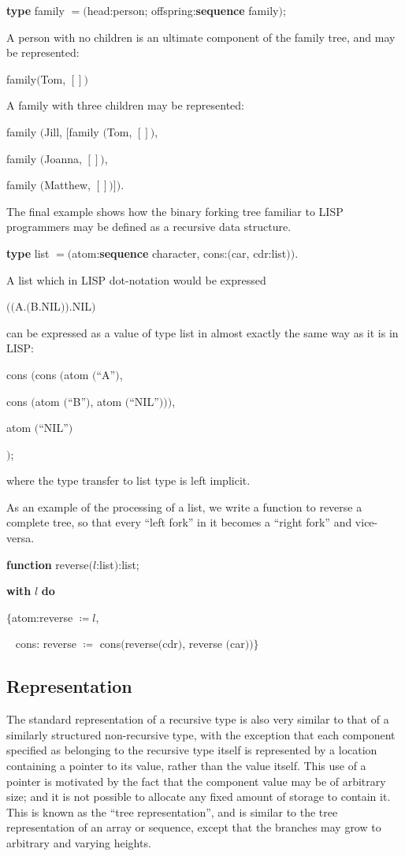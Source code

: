 \quad \textbf{type} family $= ($head:person; offspring:\textbf{sequence} family$)$;

A person with no children is an ultimate component of the family tree, and may be represented:

\quad family$($Tom, $[])$

\noindent
A family with three children may be represented:

\noindent
family $($Jill, $[$family $($Tom, $[])$,

\tabto{3.2em} family $($Joanna, $[])$,

\tabto{3.2em} family $($Matthew, $[])])$.

The final example shows how the binary forking tree familiar to LISP programmers may be defined as a recursive data structure.

\quad \textbf{type} list $= ($atom:\textbf{sequence} character, cons:$($car, cdr:list$))$.

\noindent
A list which in LISP dot-notation would be expressed

\quad $(($A.$($B.NIL$))$.NIL$)$

\noindent
can be expressed as a value of type list in almost exactly the same way as it is in LISP:

\quad cons $($cons $($atom $($``A''$)$,

\tabto{5em} cons $($atom $($``B''$)$, atom $($``NIL''$)))$,

\tabto{5em} atom $($``NIL''$)$

\tabto{4.8em} $)$;

\noindent
where the type transfer to list type is left implicit.

As an example of the processing of a list, we write a function to reverse a complete tree, so that every ``left fork'' in it becomes a ``right fork'' and vice-versa.

\quad \textbf{function} reverse$(l$:list$)$:list;

\quad \quad \textbf{with} $l$ \textbf{do}

\quad \quad \quad $\{$atom:reverse $\coloneq l$,

\quad \quad \quad ~ cons: reverse $\coloneq$ cons$($reverse$($cdr$)$, reverse $($car$))\}$

\subsection{Representation}

The standard representation of a recursive type is also very similar to that of a similarly structured non-recursive type, with the exception that each component specified as belonging to the recursive type itself is represented by a location containing a pointer to its value, rather than the value itself. This use of a pointer is motivated by the fact that the component value may be of arbitrary size; and it is not possible to allocate any fixed amount of storage to contain it. This is known as the ``tree representation'', and is similar to the tree representation of an array or sequence, except that the branches may grow to arbitrary and varying heights.

